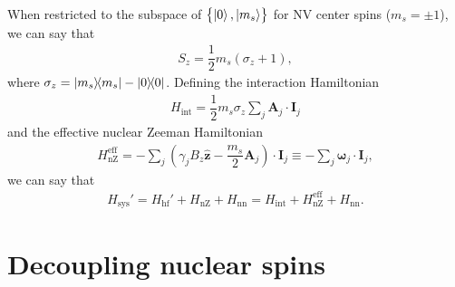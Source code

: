 \documentclass[11pt]{article}
\renewcommand{\t}{\text} %
\newcommand{\f}[2]{\dfrac{#1}{#2}} %
\newcommand{\p}[1]{\left(#1\right)} %
\renewcommand{\set}[1]{\left\{#1\right\}} %
\renewcommand{\v}{\bm} %
\newcommand{\uv}[1]{\hat{\v{#1}}} %
\renewcommand{\c}{\cdot} %
\begin{document}
When restricted to the subspace of $\set{\ket0,\ket{m_s}}$ for NV
center spins ($m_s=\pm1$), we can say that
\begin{align}
  S_z=\f12m_s\p{\sigma_z+1},
\end{align}
where $\sigma_z=\op{m_s}-\op0$. Defining the interaction Hamiltonian
\begin{align}
  H_{\t{int}}=\f12m_s\sigma_z\sum_j\v A_j\c\v I_j
\end{align}
and the effective nuclear Zeeman Hamiltonian
\begin{align}
  H_{\t{nZ}}^{\t{eff}}=-\sum_j\p{\gamma_jB_z\uv z-\f{m_s}2\v A_j}\c\v
  I_j \equiv-\sum_j\v\omega_j\c\v I_j,
\end{align}
we can say that
\begin{align}
  H_{\t{sys}}'=H_{\t{hf}}'+H_{\t{nZ}}+H_{\t{nn}}
  =H_{\t{int}}+H_{\t{nZ}}^{\t{eff}}+H_{\t{nn}}.
\end{align}

\newpage
\section*{Decoupling nuclear spins}
\end{document}
